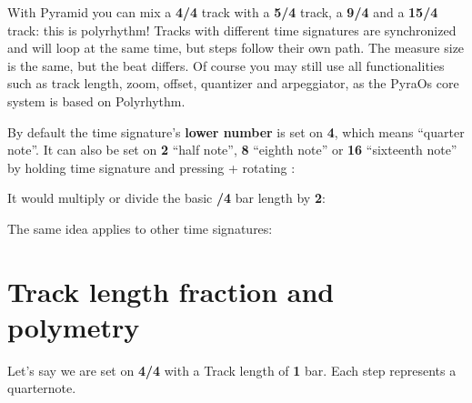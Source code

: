 

With Pyramid you can mix a \textbf{4/4} track with a \textbf{5/4} track, a \textbf{9/4} and a \textbf{15/4} track: this is polyrhythm! Tracks with different time signatures are synchronized and will loop at the same time, but steps follow their own path. The measure size is the same, but the beat differs. Of course you may still use all functionalities such as track length, zoom, offset, quantizer and arpeggiator, as the PyraOs core system is based on Polyrhythm.

By default the time signature's \textbf{lower number} is set on \textbf{4}, which means ``quarter note''. It can also be set on \textbf{2} ``half note'', \textbf{8} ``eighth note'' or \textbf{16} ``sixteenth note'' by holding time signature and pressing + rotating \encodericon{}:


It would multiply or divide the basic \textbf{/4} bar length by \textbf{2}:


The same idea applies to other time signatures:




\section{Track length fraction and polymetry}

Let's say we are set on \textbf{4/4} with a Track length of \textbf{1} bar. Each step represents a quarternote.

